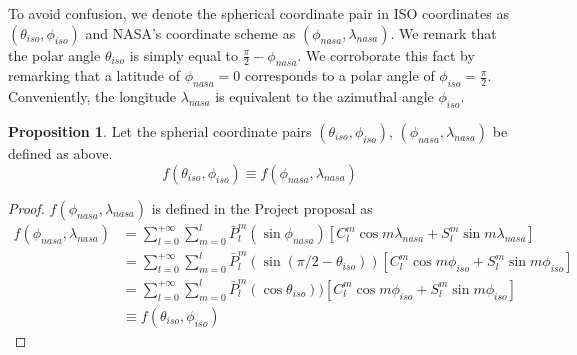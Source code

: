 \documentclass[a4paper]{article}
\theoremstyle{definition}
\newtheorem{proposition}{Proposition}
\begin{document}
To avoid confusion, we denote the spherical coordinate pair in ISO coordinates as $(\theta_{iso}, \phi_{iso})$ and NASA's coordinate scheme as $(\phi_{nasa}, \lambda_{nasa})$.
We remark that the polar angle $\theta_{iso}$ is simply equal to $\frac{\pi}{2} - \phi_{nasa}$. We corroborate this fact by remarking that a latitude of $\phi_{nasa} = 0$ corresponds to a polar
angle of $\phi_{iso} = \frac{\pi}{2}$. Conveniently, the longitude $\lambda_{nasa}$ is equivalent to the azimuthal angle $\phi_{iso}$.

\begin{proposition} Let the spherial coordinate pairs $(\theta_{iso}, \phi_{iso})$, $(\phi_{nasa}, \lambda_{nasa})$ be defined as above. 
    \begin{equation*}
        f(\theta_{iso}, \phi_{iso}) \equiv f(\phi_{nasa}, \lambda_{nasa})
    \end{equation*}

    
\end{proposition}



\begin{proof}
    $f(\phi_{nasa}, \lambda_{nasa})$ is defined in the Project proposal as 
    \begin{align} \label{eq:project_def} 
        f(\phi_{nasa}, \lambda_{nasa}) &= \sum_{l = 0}^{+\infty}\sum_{m = 0}^l \bar P_l^m(\sin\phi_{nasa})[C_l^m\cos m\lambda_{nasa} + S_l^m \sin m \lambda_{nasa}] \\ 
                                       &= \sum_{l = 0}^{+\infty}\sum_{m = 0}^l \bar P_l^m(\sin(\pi/2 - \theta_{iso}))[C_l^m\cos m\phi_{iso} + S_l^m \sin m \phi_{iso}] \\
                                       &= \sum_{l = 0}^{+\infty}\sum_{m = 0}^l \bar P_l^m(\cos\theta_{iso}))[C_l^m\cos m\phi_{iso} + S_l^m \sin m \phi_{iso}] \\
                                       &\equiv f(\theta_{iso}, \phi_{iso})
    \end{align}

\end{proof}

\nocite{*}



\end{document}
